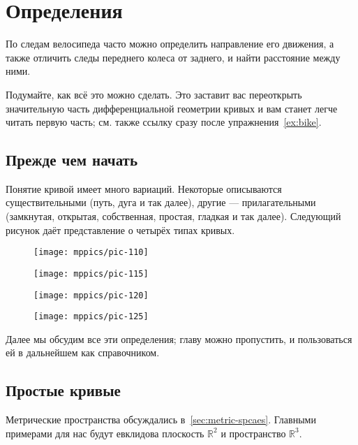 \chapter{Определения}
\label{chap:curves-def}

По следам велосипеда часто можно определить направление его движения, а также отличить следы переднего колеса от заднего, и найти расстояние между ними.

Подумайте, как всё это можно сделать.
Это заставит вас переоткрыть значительную часть дифференциальной геометрии кривых и вам станет легче читать первую часть;
см. также ссылку сразу после упражнения~\ref{ex:bike}.

\section{Прежде чем начать}

Понятие кривой имеет много вариаций.
Некоторые описываются существительными (путь, дуга и так далее), 
другие --- прилагательными (замкнутая, открытая, собственная, простая, гладкая и так далее).
Следующий рисунок даёт представление о четырёх типах кривых.

\vskip-0mm
\begin{figure}[h!]
\begin{minipage}{.48\textwidth}
\centering
\texttt{[image: mppics/pic-110]}
\end{minipage}\hfill
\begin{minipage}{.48\textwidth}
\centering
\texttt{[image: mppics/pic-115]}
\end{minipage}
\bigskip
\begin{minipage}{.48\textwidth}
\centering
\texttt{[image: mppics/pic-120]}
\end{minipage}\hfill
\begin{minipage}{.48\textwidth}
\centering
\texttt{[image: mppics/pic-125]}
\end{minipage}
\end{figure}
\vskip-0mm

Далее мы обсудим все эти определения;
главу можно пропустить, и пользоваться ей в дальнейшем как справочником.

\section{Простые кривые}

Метрические пространства обсуждались в~\ref{sec:metric-spcaes}.
Главными примерами для нас будут евклидова плоскость $\mathbb{R}^2$ и пространство $\mathbb{R}^3$.

